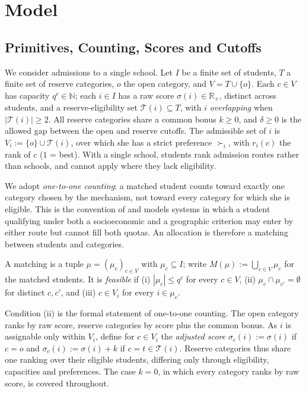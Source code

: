 \documentclass[runningheads]{llncs}
\newcommand{\T}{\mathcal{T}}
\newcommand{\R}{\mathbb{R}}
\begin{document}
\section{Model}
\label{sec:model}

\subsection{Primitives, Counting, Scores and Cutoffs}

We consider admissions to a single school. Let $I$ be a finite set of students, $T$ a finite set of reserve categories, $o$ the open category, and $V=T\cup\{o\}$. Each $c\in V$ has capacity $q^c\in\mathbb{N}$; each $i\in I$ has a raw score $\sigma(i)\in\R_+$, distinct across students, and a reserve-eligibility set $\T(i)\subseteq T$, with $i$ \emph{overlapping} when $|\T(i)|\ge2$. All reserve categories share a common bonus $k\ge0$, and $\delta\ge0$ is the allowed gap between the open and reserve cutoffs. The admissible set of $i$ is $V_i:=\{o\}\cup\T(i)$, over which she has a strict preference $\succ_i$, with $r_i(c)$ the rank of $c$ ($1$ = best). With a single school, students rank admission routes rather than schools, and cannot apply where they lack eligibility.

We adopt \emph{one-to-one counting}: a matched student counts toward exactly one category chosen by the mechanism, not toward every category for which she is eligible. This is the convention of \cite{KHIY17a,AyBo21a,GKK+17a} and models systems in which a student qualifying under both a socioeconomic and a geographic criterion may enter by either route but cannot fill both quotas. An allocation is therefore a matching between students and categories.

\begin{definition}
A matching is a tuple $\mu=(\mu_c)_{c\in V}$ with $\mu_c\subseteq I$; write $M(\mu):=\bigcup_{c\in V}\mu_c$ for the matched students. It is \emph{feasible} if (i) $|\mu_c|\le q^c$ for every $c\in V$, (ii) $\mu_c\cap\mu_{c'}=\emptyset$ for distinct $c,c'$, and (iii) $c\in V_i$ for every $i\in\mu_c$.
\end{definition}

Condition (ii) is the formal statement of one-to-one counting. The open category ranks by raw score, reserve categories by score plus the common bonus. As $i$ is assignable only within $V_i$, define for $c\in V_i$ the \emph{adjusted score} $\sigma_c(i):=\sigma(i)$ if $c=o$ and $\sigma_c(i):=\sigma(i)+k$ if $c=t\in\T(i)$. Reserve categories thus share one ranking over their eligible students, differing only through eligibility, capacities and preferences. The case $k=0$, in which every category ranks by raw score, is covered throughout.
\end{document}
